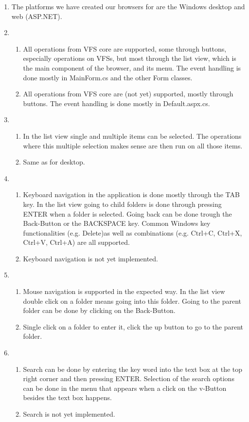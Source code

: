 \documentclass[a4paper,12pt]{article}
\begin{document}
\begin{enumerate}
	\item The platforms we have created our browsers for are the Windows desktop and web (ASP.NET).
	\item
		\begin{enumerate} [label={(\alph*)}]
		\item All operations from VFS core are supported, some through buttons, especially operations on VFSs, but most through the list view, which is the main component of the browser, and its menu. The event handling is done mostly in MainForm.cs and the other Form classes.
		\item All operations from VFS core are (not yet) supported, mostly through buttons. The event handling is done mostly in\newline
		Default.aspx.cs.
		\end{enumerate}
	\item
		\begin{enumerate} [label={(\alph*)}]
		\item In the list view single and multiple items can be selected. The operations where this multiple selection makes sense are then run on all those items.
		\item Same as for desktop.
		\end{enumerate}
	\item
		\begin{enumerate} [label={(\alph*)}]
		\item Keyboard navigation in the application is done mostly through the TAB key. In the list view going to child folders is done through pressing ENTER when a folder is selected. Going back can be done trough the Back-Button or the BACKSPACE key. Common Windows key functionalities (e.g. Delete)as well as combinations (e.g. Ctrl+C, Ctrl+X, Ctrl+V, Ctrl+A) are all supported.
		\item Keyboard navigation is not yet implemented.
		\end{enumerate}
	\item
		\begin{enumerate} [label={(\alph*)}]
		\item Mouse navigation is supported in the expected way. In the list view double click on a folder means going into this folder. Going to the parent folder can be done by clicking on the Back-Button.
		\item Single click on a folder to enter it, click the up button to go to the parent folder.
		\end{enumerate}
	\item
		\begin{enumerate} [label={(\alph*)}]
		\item Search can be done by entering the key word into the text box at the top right corner and then pressing ENTER. Selection of the search options can be done in the menu that appears when a click on the v-Button besides the text box happens.
		\item Search is not yet implemented.
		\end{enumerate}
\end{enumerate}
\end{document}
